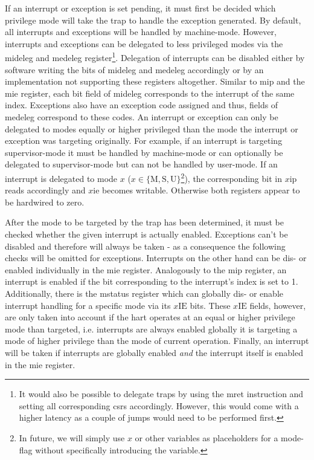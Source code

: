If an interrupt or exception is set pending, it must first be decided which privilege mode will take the trap to handle the exception generated.
By default, all interrupts and exceptions will be handled by machine-mode.
However, interrupts and exceptions can be delegated to less privileged modes via the \gls{mideleg} and \gls{medeleg} register\footnote{%
    It would also be possible to delegate traps by using the \gls{mret} instruction and setting all corresponding \glspl{csr} accordingly.
    However, this would come with a higher latency as a couple of jumps would need to be performed first.
}.
Delegation of interrupts can be disabled either by software writing the bits of \gls{mideleg} and \gls{medeleg} accordingly or by an implementation not supporting these registers altogether.
Similar to \gls{mip} and the \gls{mie} register, each bit field of \gls{mideleg} corresponds to the interrupt of the same index.
Exceptions also have an exception code assigned and thus, fields of \gls{medeleg} correspond to these codes.
An interrupt or exception can only be delegated to modes equally or higher privileged than the mode the interrupt or exception was targeting originally.
For example, if an interrupt is targeting supervisor-mode it must be handled by machine-mode or can optionally be delegated to supervisor-mode but can not be handled by user-mode.
If an interrupt is delegated to mode $ x $ ($ x \in \{ \text{M}, \text{S}, \text{U}\} $\footnote{%
In future, we will simply use $ x $ or other variables as placeholders for a mode-flag without specifically introducing the variable.
}), the corresponding bit in $ x\text{ip} $ reads accordingly and $ x\text{ie} $ becomes writable.
Otherwise both registers appear to be hardwired to zero.

After the mode to be targeted by the trap has been determined, it must be checked whether the given interrupt is actually enabled.
Exceptions can't be disabled and therefore will always be taken - as a consequence the following checks will be omitted for exceptions.
Interrupts on the other hand can be dis- or enabled individually in the \gls{mie} register.
Analogously to the \gls{mip} register, an interrupt is enabled if the bit corresponding to the interrupt's index is set to 1.
Additionally, there is the \gls{mstatus} register which can globally dis- or enable interrupt handling for a specific mode via its $ x\text{IE} $ bits.
These $ x\text{IE} $ fields, however, are only taken into account if the \gls{hart} operates at an equal or higher privilege mode than targeted, i.e. interrupts are always enabled globally it is targeting a mode of higher privilege than the mode of current operation.
Finally, an interrupt will be taken if interrupts are globally enabled \textit{and} the interrupt itself is enabled in the \gls{mie} register.

